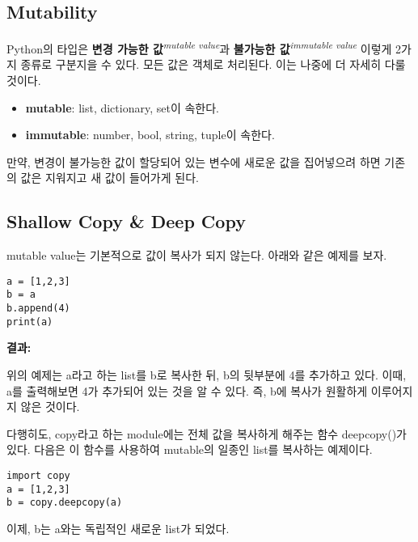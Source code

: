 \subsection{Mutability}
Python의 타입은 \textbf{변경 가능한 값}\textit{\textsuperscript{mutable value}}과 \textbf{불가능한 값}\textit{\textsuperscript{immutable value}} 이렇게 2가지 종류로 구분지을 수 있다. 모든 값은 객체로 처리된다. 이는 나중에 더 자세히 다룰 것이다.

\begin{itemize}
    \item \textbf{mutable}: list, dictionary, set이 속한다.
    \item \textbf{immutable}: number, bool, string, tuple이 속한다.
\end{itemize}
만약, 변경이 불가능한 값이 할당되어 있는 변수에 새로운 값을 집어넣으려 하면 기존의 값은 지워지고 새 값이 들어가게 된다.

\subsection{Shallow Copy \& Deep Copy}
mutable value는 기본적으로 값이 복사가 되지 않는다. 아래와 같은 예제를 보자.

\begin{minipage}{\textwidth}
\begin{tcolorbox}[colframe=black, colback=white]
\begin{verbatim}
a = [1,2,3]
b = a
b.append(4)
print(a)
\end{verbatim}
\end{tcolorbox}
\textbf{결과: }
\fbox{\texttt{[1,2,3,4]}}
\end{minipage}

위의 예제는 a라고 하는 list를 b로 복사한 뒤, b의 뒷부분에 4를 추가하고 있다. 이때, a를 출력해보면 4가 추가되어 있는 것을 알 수 있다. 즉, b에 복사가 원활하게 이루어지지 않은 것이다.

다행히도, copy라고 하는 module에는 전체 값을 복사하게 해주는 함수 deepcopy()가 있다. 다음은 이 함수를 사용하여 mutable의 일종인 list를 복사하는 예제이다.

\begin{tcolorbox}[colframe=black, colback=white]
\begin{verbatim}
import copy
a = [1,2,3]
b = copy.deepcopy(a)
\end{verbatim}
\end{tcolorbox}

이제, b는 a와는 독립적인 새로운 list가 되었다.

